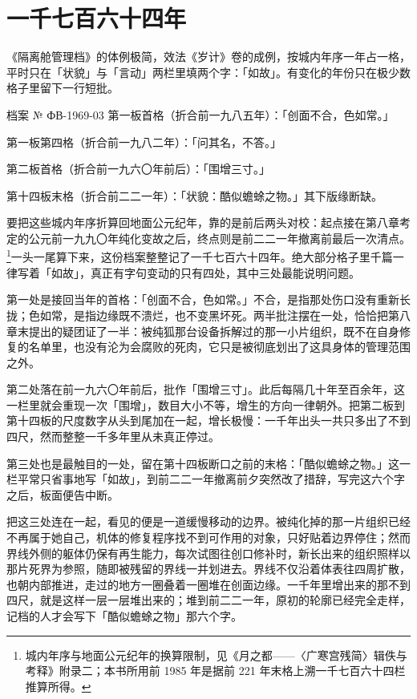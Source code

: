 \section{一千七百六十四年}

《隔离舱管理档》的体例极简，效法《岁计》卷的成例，按城内年序一年占一格，平时只在「状貌」与「言动」两栏里填两个字：「如故」。有变化的年份只在极少数格子里留下一行短批。

\begin{archive}[内部参考]{档案 № ФВ-1969-03}
第一板首格（折合前一九八五年）：「创面不合，色如常。」\par{}
第一板第四格（折合前一九八二年）：「问其名，不答。」\par{}
第二板首格（折合前一九六〇年前后）：「围增三寸。」\par{}
第十四板末格（折合前二二一年）：「状貌：酷似蟾蜍之物。」其下版缘断缺。
\end{archive}

要把这些城内年序折算回地面公元纪年，靠的是前后两头对校：起点接在第八章考定的公元前一九九〇年纯化变故之后，终点则是前二二一年撤离前最后一次清点。\footnote{城内年序与地面公元纪年的换算限制，见《月之都——〈广寒宫残简〉辑佚与考释》附录二；本书所用前 1985 年是据前 221 年末格上溯一千七百六十四栏推算所得。}一头一尾算下来，这份档案整整记了一千七百六十四年。绝大部分格子里千篇一律写着「如故」，真正有字句变动的只有四处，其中三处最能说明问题。

第一处是接回当年的首格：「创面不合，色如常。」不合，是指那处伤口没有重新长拢；色如常，是指边缘既不溃烂，也不变黑坏死。两半批注摆在一处，恰恰把第八章末提出的疑团证了一半：被纯狐那台设备拆解过的那一小片组织，既不在自身修复的名单里，也没有沦为会腐败的死肉，它只是被彻底划出了这具身体的管理范围之外。

第二处落在前一九六〇年前后，批作「围增三寸」。此后每隔几十年至百余年，这一栏里就会重现一次「围增」，数目大小不等，增生的方向一律朝外。把第二板到第十四板的尺度数字从头到尾加在一起，增长极慢：一千年出头一共只多出了不到四尺，然而整整一千多年里从未真正停过。

第三处也是最触目的一处，留在第十四板断口之前的末格：「酷似蟾蜍之物。」这一栏平常只省事地写「如故」，到前二二一年撤离前夕突然改了措辞，写完这六个字之后，板面便告中断。

把这三处连在一起，看见的便是一道缓慢移动的边界。被纯化掉的那一片组织已经不再属于她自己，机体的修复程序找不到可作用的对象，只好贴着边界停住；然而界线外侧的躯体仍保有再生能力，每次试图往创口修补时，新长出来的组织照样以那片死界为参照，随即被残留的界线一并划进去。界线不仅沿着体表往四周扩散，也朝内部推进，走过的地方一圈叠着一圈堆在创面边缘。一千年里增出来的那不到四尺，就是这样一层一层堆出来的；堆到前二二一年，原初的轮廓已经完全走样，记档的人才会写下「酷似蟾蜍之物」那六个字。

